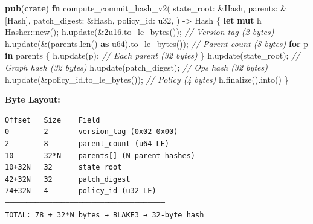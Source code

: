 \documentclass[11pt]{book}
\newenvironment{Shaded}{}{}
\newcommand{\BuiltInTok}[1]{\textcolor[rgb]{0.00,0.50,0.00}{#1}}
\newcommand{\CommentTok}[1]{\textcolor[rgb]{0.38,0.63,0.69}{\textit{#1}}}
\newcommand{\ControlFlowTok}[1]{\textcolor[rgb]{0.00,0.44,0.13}{\textbf{#1}}}
\newcommand{\DataTypeTok}[1]{\textcolor[rgb]{0.56,0.13,0.00}{#1}}
\newcommand{\DecValTok}[1]{\textcolor[rgb]{0.25,0.63,0.44}{#1}}
\newcommand{\KeywordTok}[1]{\textcolor[rgb]{0.00,0.44,0.13}{\textbf{#1}}}
\newcommand{\NormalTok}[1]{#1}
\newcommand{\OperatorTok}[1]{\textcolor[rgb]{0.40,0.40,0.40}{#1}}
\newcommand{\PreprocessorTok}[1]{\textcolor[rgb]{0.74,0.48,0.00}{#1}}
\begin{document}
\begin{Shaded}
\begin{Highlighting}[]
\KeywordTok{pub}\NormalTok{(}\KeywordTok{crate}\NormalTok{) }\KeywordTok{fn}\NormalTok{ compute\_commit\_hash\_v2(}
\NormalTok{    state\_root}\OperatorTok{:} \OperatorTok{\&}\BuiltInTok{Hash}\OperatorTok{,}
\NormalTok{    parents}\OperatorTok{:} \OperatorTok{\&}\NormalTok{[}\BuiltInTok{Hash}\NormalTok{]}\OperatorTok{,}
\NormalTok{    patch\_digest}\OperatorTok{:} \OperatorTok{\&}\BuiltInTok{Hash}\OperatorTok{,}
\NormalTok{    policy\_id}\OperatorTok{:} \DataTypeTok{u32}\OperatorTok{,}
\NormalTok{) }\OperatorTok{{-}\textgreater{}} \BuiltInTok{Hash} \OperatorTok{\{}
    \KeywordTok{let} \KeywordTok{mut}\NormalTok{ h }\OperatorTok{=} \BuiltInTok{Hasher}\PreprocessorTok{::}\NormalTok{new()}\OperatorTok{;}
\NormalTok{    h}\OperatorTok{.}\NormalTok{update(}\OperatorTok{\&}\DecValTok{2u16}\OperatorTok{.}\NormalTok{to\_le\_bytes())}\OperatorTok{;}              \CommentTok{// Version tag (2 bytes)}
\NormalTok{    h}\OperatorTok{.}\NormalTok{update(}\OperatorTok{\&}\NormalTok{(parents}\OperatorTok{.}\NormalTok{len() }\KeywordTok{as} \DataTypeTok{u64}\NormalTok{)}\OperatorTok{.}\NormalTok{to\_le\_bytes())}\OperatorTok{;}  \CommentTok{// Parent count (8 bytes)}
    \ControlFlowTok{for}\NormalTok{ p }\KeywordTok{in}\NormalTok{ parents }\OperatorTok{\{}
\NormalTok{        h}\OperatorTok{.}\NormalTok{update(p)}\OperatorTok{;}                            \CommentTok{// Each parent (32 bytes)}
    \OperatorTok{\}}
\NormalTok{    h}\OperatorTok{.}\NormalTok{update(state\_root)}\OperatorTok{;}                       \CommentTok{// Graph hash (32 bytes)}
\NormalTok{    h}\OperatorTok{.}\NormalTok{update(patch\_digest)}\OperatorTok{;}                     \CommentTok{// Ops hash (32 bytes)}
\NormalTok{    h}\OperatorTok{.}\NormalTok{update(}\OperatorTok{\&}\NormalTok{policy\_id}\OperatorTok{.}\NormalTok{to\_le\_bytes())}\OperatorTok{;}         \CommentTok{// Policy (4 bytes)}
\NormalTok{    h}\OperatorTok{.}\NormalTok{finalize()}\OperatorTok{.}\NormalTok{into()}
\OperatorTok{\}}
\end{Highlighting}
\end{Shaded}

\textbf{Byte Layout:}

\begin{verbatim}
Offset   Size    Field
0        2       version_tag (0x02 0x00)
2        8       parent_count (u64 LE)
10       32*N    parents[] (N parent hashes)
10+32N   32      state_root
42+32N   32      patch_digest
74+32N   4       policy_id (u32 LE)
─────────────────────────────────────
TOTAL: 78 + 32*N bytes → BLAKE3 → 32-byte hash
\end{verbatim}
\end{document}
